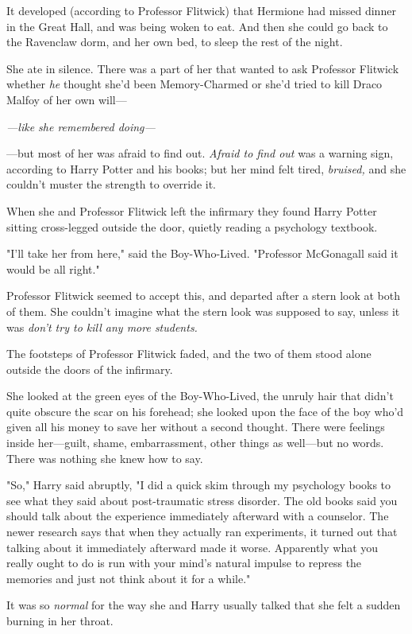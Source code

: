 It developed (according to Professor Flitwick) that Hermione had missed dinner
in the Great Hall, and was being woken to eat. And then she could go back to
the Ravenclaw dorm, and her own bed, to sleep the rest of the night.

She ate in silence. There was a part of her that wanted to ask Professor
Flitwick whether \emph{he} thought she'd been Memory-Charmed or she'd tried to
kill Draco Malfoy of her own will---

\emph{---like she remembered doing---}

---but most of her was afraid to find out. \emph{Afraid to find out} was a
warning sign, according to Harry Potter and his books; but her mind felt tired,
\emph{bruised,} and she couldn't muster the strength to override it.

When she and Professor Flitwick left the infirmary they found Harry Potter
sitting cross-legged outside the door, quietly reading a psychology textbook.

"I'll take her from here," said the Boy-Who-Lived. "Professor McGonagall said
it would be all right."

Professor Flitwick seemed to accept this, and departed after a stern look at
both of them. She couldn't imagine what the stern look was supposed to say,
unless it was \emph{don't try to kill any more students.}

The footsteps of Professor Flitwick faded, and the two of them stood alone
outside the doors of the infirmary.

She looked at the green eyes of the Boy-Who-Lived, the unruly hair that didn't
quite obscure the scar on his forehead; she looked upon the face of the boy
who'd given all his money to save her without a second thought. There were
feelings inside her---guilt, shame, embarrassment, other things as well---but
no words. There was nothing she knew how to say.

"So," Harry said abruptly, "I did a quick skim through my psychology books to
see what they said about post-traumatic stress disorder. The old books said you
should talk about the experience immediately afterward with a counselor. The
newer research says that when they actually ran experiments, it turned out that
talking about it immediately afterward made it worse. Apparently what you
really ought to do is run with your mind's natural impulse to repress the
memories and just not think about it for a while."

It was so \emph{normal} for the way she and Harry usually talked that she felt
a sudden burning in her throat.

